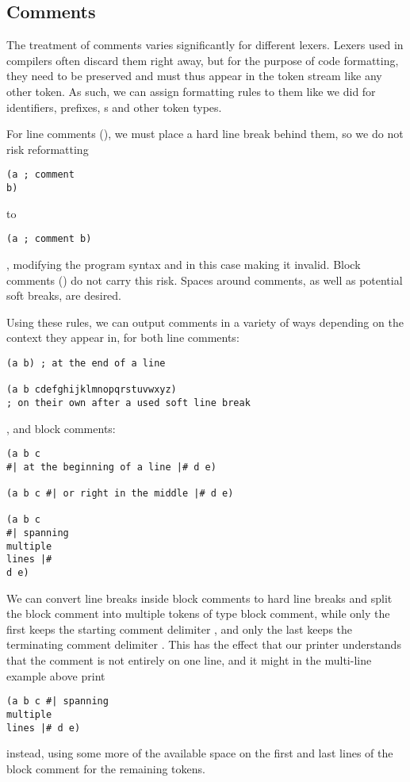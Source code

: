 \subsection{Comments}
The treatment of comments varies significantly for different lexers.
Lexers used in compilers often discard them right away,
but for the purpose of code formatting, they need to be preserved
and must thus appear in the token stream like any other token.
As such, we can assign formatting rules to them like we did for
identifiers, prefixes, s and other token types.

For line comments (\code{;}), we must place a hard line break behind them,
so we do not risk reformatting
\begin{verbatim}
(a ; comment
b)
\end{verbatim}
to
\begin{verbatim}
(a ; comment b)
\end{verbatim}
, modifying the program syntax and in this case making it invalid.
Block comments (\code{#| |#}) do not carry this risk.
Spaces around comments, as well as potential soft breaks, are desired.

Using these rules, we can output comments in a variety of ways
depending on the context they appear in, for both line comments:
\begin{verbatim}
(a b) ; at the end of a line

(a b cdefghijklmnopqrstuvwxyz)
; on their own after a used soft line break
\end{verbatim}
, and block comments:
\begin{verbatim}
(a b c
#| at the beginning of a line |# d e)

(a b c #| or right in the middle |# d e)

(a b c
#| spanning
multiple
lines |#
d e)
\end{verbatim}

We can convert line breaks inside block comments to hard line breaks
and split the block comment into multiple tokens of type block comment,
while only the first keeps the starting comment delimiter \code{#|},
and only the last keeps the terminating comment delimiter \code{|#}.
This has the effect that our printer understands that the comment
is not entirely on one line, and it might in the multi-line example above print
\begin{verbatim}
(a b c #| spanning
multiple
lines |# d e)
\end{verbatim}
instead, using some more of the available space
on the first and last lines of the block comment for the remaining tokens.

